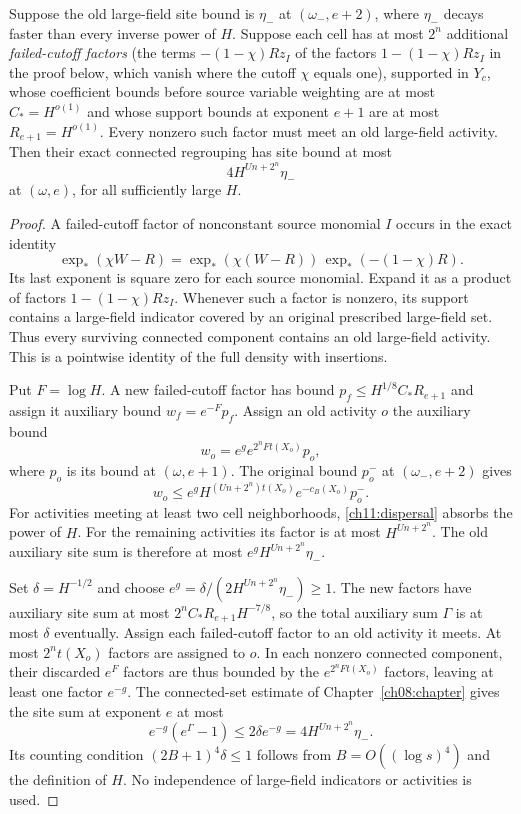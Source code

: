 \begin{lemma}
\label{ch11:restore-forced}
Suppose the old large-field site bound is $\eta_-$ at
$(\omega_-,e+2)$, where $\eta_-$ decays faster than every inverse
power of $H$. Suppose each cell has at most $2^n$ additional
\emph{failed-cutoff factors} (the terms $-(1-\chi)Rz_I$ of the factors $1-(1-\chi)Rz_I$ in the proof below, which vanish where the cutoff $\chi$ equals one), supported in $Y_c$, whose coefficient
bounds before source variable weighting are at most $C_*=H^{o(1)}$ and whose
support bounds at exponent $e+1$ are at most $R_{e+1}=H^{o(1)}$.
Every nonzero such factor must meet an old large-field activity.
Then their exact connected regrouping has site bound at most
\[
 4H^{Un+2^n}\eta_-
\]
at $(\omega,e)$, for all sufficiently large $H$.
\end{lemma}
\begin{proof}
A failed-cutoff factor of nonconstant source monomial $I$ occurs in the exact
identity
\[
 \exp_*(\chi W-R)
   =\exp_*(\chi(W-R))\,\exp_*(-(1-\chi)R).
\]
Its last exponent is square zero for each source monomial.
Expand it as a product of factors $1-(1-\chi)Rz_I$.
Whenever such a factor is nonzero, its support contains a large-field indicator
covered by an original prescribed large-field set. Thus every surviving
connected component contains an old large-field activity.
This is a pointwise identity of the full density with insertions.

Put $F=\log H$. A new failed-cutoff factor has bound
$p_f\le H^{1/8}C_*R_{e+1}$ and assign it auxiliary bound
$w_f=e^{-F}p_f$. Assign an old activity $o$ the auxiliary bound
\[
 w_o=e^g e^{2^nFt(X_o)}p_o,
\]
where $p_o$ is its bound at $(\omega,e+1)$.
The original bound $p_o^-$ at $(\omega_-,e+2)$ gives
\[
 w_o\le e^gH^{(Un+2^n)t(X_o)}
                     e^{-c_B(X_o)}p_o^-.
\]
For activities meeting at least two cell neighborhoods,
\eqref{ch11:dispersal} absorbs the power of $H$.
For the remaining activities its factor is at most $H^{Un+2^n}$.
The old auxiliary site sum is therefore at most
$e^gH^{Un+2^n}\eta_-$.

Set $\delta=H^{-1/2}$ and choose
$e^g=\delta/(2H^{Un+2^n}\eta_-)\ge1$.
The new factors have auxiliary site sum at most
$2^nC_*R_{e+1}H^{-7/8}$, so the total auxiliary sum
$\Gamma$ is at most $\delta$ eventually.
Assign each failed-cutoff factor to an old activity it meets.
At most $2^nt(X_o)$ factors are assigned to $o$.
In each nonzero connected component, their discarded
$e^F$ factors are thus bounded by the $e^{2^nFt(X_o)}$
factors, leaving at least one factor $e^{-g}$.
The connected-set estimate of Chapter~\ref{ch08:chapter}
gives the site sum at exponent $e$ at most
\[
 e^{-g}(e^\Gamma-1)
 \le2\delta e^{-g}=4H^{Un+2^n}\eta_-.
\]
Its counting condition $(2B+1)^4\delta\le1$ follows from
$B=O((\log s)^4)$ and the definition of $H$.
No independence of large-field indicators or activities is used.
\end{proof}

